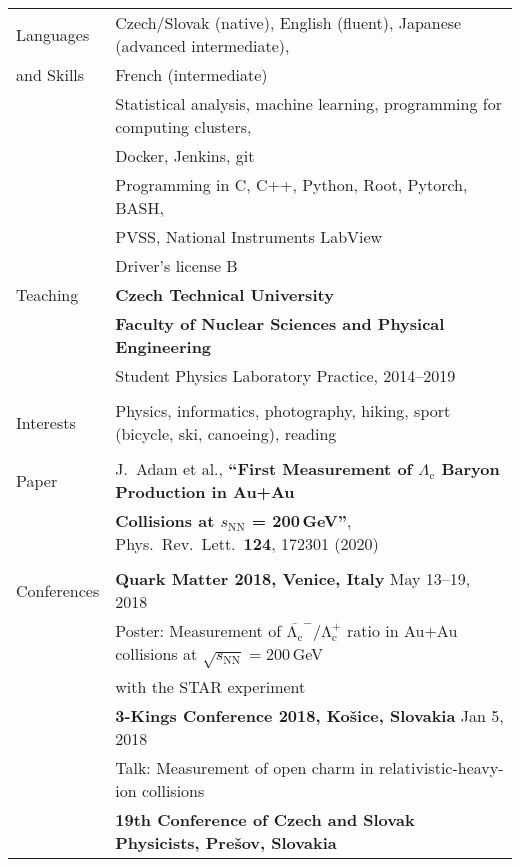 \documentclass[a4paper,11pt,oneside]{article}
\begin{document}
\newpage

\noindent  \begin{tabular}{@{} l l}
  \Large{Languages}   & Czech/Slovak (native), English (fluent), Japanese (advanced intermediate), \\
\Large{and Skills}    & French (intermediate)  \\[.2cm]
     & Statistical analysis, machine learning, programming for computing clusters, \\
     & Docker, Jenkins, git\\[.2cm]
     & Programming in C, C++, Python, Root, Pytorch, BASH,  \\
     & PVSS, National Instruments LabView \\[.2cm]
     & Driver's license B\\[.3cm]
  \Large{Teaching}  & \textbf{Czech Technical University} \\
     & \textbf{Faculty of Nuclear Sciences and Physical Engineering} \\
     & Student Physics Laboratory Practice, 2014--2019\\
     \\
\Large{Interests}    
     & Physics, informatics, photography, hiking, sport (bicycle, ski, canoeing), reading \\
     \\
\Large{Paper}
     & J.\ Adam et al., \textbf{``First Measurement of $\Lambda_\mathrm{c}$ Baryon Production in Au+Au} \\
     & \textbf{Collisions at $s_\mathrm{NN}$ = 200$\,$GeV''}, Phys.\ Rev.\ Lett.\ \textbf{124}, 172301 (2020) \\
     \\
\Large{Conferences}
     & \textbf{Quark Matter 2018, Venice, Italy} May 13--19, 2018 \\
     & Poster: Measurement of $\mathrm{\overline{\Lambda_c}^-/\Lambda_c^+}$ ratio in Au+Au collisions at $\sqrt{s_\mathrm{NN}} = 200\,$GeV\\
     &with the STAR experiment \\[.2cm]
     & \textbf{3-Kings Conference 2018, Košice, Slovakia} Jan 5, 2018 \\
     & Talk: Measurement of open charm in relativistic-heavy-ion collisions \\[.2cm]
     & \textbf{19th Conference of Czech and Slovak Physicists, Prešov, Slovakia}\\

\end{tabular}
\end{document}
